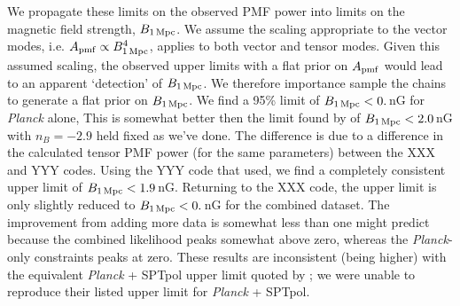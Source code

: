 \documentclass[apj]{emulateapj}
\newcommand{\apmf}{\ensuremath{A_{\rm pmf}}}
\newcommand{\bpmf}{\ensuremath{B_{\rm 1\,Mpc}}}
\newcommand{\planck}{{\sl Planck}}
\newcommand{\sptpol}{SPTpol}
\begin{document}
We propagate these limits on the observed PMF power into limits on the magnetic field strength, \bpmf. 
We assume the scaling appropriate to the vector modes, i.e. $\apmf \propto \bpmf^4$,  applies to both vector and tensor modes. 
Given this assumed scaling, the observed upper limits with a flat prior on \apmf{} would lead to an apparent `detection' of \bpmf. 
We therefore importance sample the chains to generate a flat prior on \bpmf. 
We find a 95\% limit of $\bpmf < \upperBplk$\,nG for \planck{} alone,
This is somewhat better then the limit found by \citet{planck15-19} of $\bpmf < 2.0$\,nG with $n_B=-2.9$ held fixed as we've done. 
The difference is due to a difference in the calculated tensor PMF power (for the same parameters) between the XXX and YYY codes. 
Using the YYY code that \citet{planck15-19} used, we find a completely consistent upper limit of $\bpmf < 1.9$\,nG. 
Returning to the XXX code, the upper limit is only slightly reduced to $\bpmf < \upperBall$\,nG for the combined dataset. 
The improvement from adding more data is somewhat less than one might predict because the combined likelihood peaks somewhat above zero, whereas the \planck{}-only constraints peaks at zero. 
These results are inconsistent (being higher) with the equivalent \planck{} + \sptpol{} upper limit quoted by \citet{zucca16}; we were unable to reproduce their listed upper limit for \planck{} + \sptpol{}. 
\end{document}
